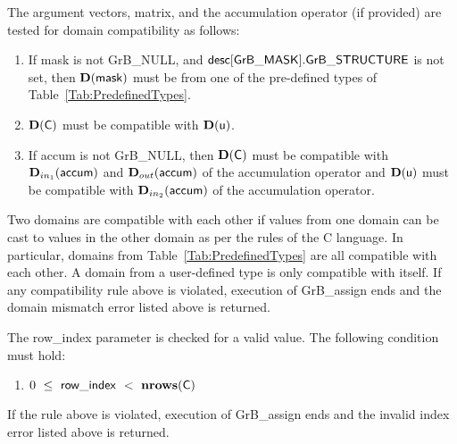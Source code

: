 The argument vectors, matrix, and the accumulation 
operator (if provided) are tested for domain compatibility as follows:
\begin{enumerate}
	\item If {\sf mask} is not {\sf GrB\_NULL}, and ${\sf desc[GrB\_MASK].GrB\_STRUCTURE}$
    is not set, then $\bold{D}({\sf mask})$ must be from one of the pre-defined types of 
    Table~\ref{Tab:PredefinedTypes}.

	\item $\bold{D}({\sf C})$ must be 
    compatible with $\bold{D}({\sf u})$.

	\item If {\sf accum} is not {\sf GrB\_NULL}, then $\bold{D}({\sf C})$ must be
    compatible with $\mbox{$\mathbf{D}_{in_{1}}$}({\sf accum})$ and $\mbox{$\mathbf{D}_{out}$}({\sf accum})$ of the accumulation operator and 
    $\bold{D}({\sf u})$ must be compatible with $\mbox{$\mathbf{D}_{in_{2}}$}({\sf accum})$ of the accumulation operator.
\end{enumerate}
Two domains are compatible with each other if values from one domain can be cast 
to values in the other domain as per the rules of the C language.
In particular, domains from Table~\ref{Tab:PredefinedTypes} are all compatible 
with each other. A domain from a user-defined type is only compatible with itself.
If any compatibility rule above is violated, execution of {\sf GrB\_assign} ends
and the domain mismatch error listed above is returned.

The {\sf row\_index} parameter is checked for a valid value.  The following
condition must hold:
\begin{enumerate}
	\item $0\ \leq\ {\sf row\_index} \ <\ \bold{nrows}({\sf C})$
\end{enumerate}
If the rule above is violated, execution of {\sf GrB\_assign} ends 
and the invalid index error listed above is returned.

